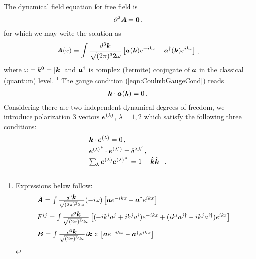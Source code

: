 The dynamical field equation for free field is
\begin{eqnarray}
\partial^2 \mbox{\boldmath $A$} = \mbox{\boldmath $0$}\,,
\end{eqnarray}
for which we may write the solution as
\begin{eqnarray}
\mbox{\boldmath $A$}(x) = \int \frac{d^3 \mbox{\boldmath $k$}}{\sqrt{(2\pi)^3}2\omega} 
\left[
\mbox{\boldmath $a$}^{}(\mbox{\boldmath $k$}) e^{-i k x} + \mbox{\boldmath $a$}^{\dagger}(\mbox{\boldmath $k$}) e^{i k x} 
\right] \,,
\label{eqn:CoulPhoAA}
\end{eqnarray}
where $\omega = k^0 = |\mbox{\boldmath $k$}|$ and $\mbox{\boldmath $a$}^{\dagger}$ is
complex (hermite) conjugate of $\mbox{\boldmath $a$}$ in the classical (quantum) level.
\footnote{%
Expressions below follow:
\begin{eqnarray}
\begin{array}{l}
\dot{\bld{A}} =
\int
\frac{d^3 \bld{k}}{\sqrt{(2\pi)^3} 2\omega}
(-i\omega)
\left[
\bld{a} e^{-ikx} - \bld{a}^\dagger e^{ikx}
\right]
\vspace{2mm}
\\
F^{ij} = 
\int
\frac{d^3 \bld{k}}{\sqrt{(2\pi)^3} 2\omega}
\left[
(-ik^i a^j + ik^j a^i )  e^{-ikx}
+
(ik^i a^{j \dagger} - ik^j a^{i \dagger} )  e^{ikx}
\right]
\vspace{2mm}
\\
\bld{B} = 
\int
\frac{d^3 \bld{k}}{\sqrt{(2\pi)^3} 2\omega}
i \bld{k} \times
\left[
\bld{a} e^{-ikx} - \bld{a}^\dagger e^{ikx}
\right]
\end{array}
\end{eqnarray}
}%
The gauge condition (\ref{eqn:CoulmbGaugeCond}) reads
\begin{eqnarray}
\mbox{\boldmath $k$} \cdot \mbox{\boldmath $a$}^{} (\mbox{\boldmath $k$}) = 0 \,.
\label{eqn:CoulmbGCondMom}
\end{eqnarray}
Considering there are two independent dynamical degrees of freedom, we introduce
polarization 3 vectors $\mbox{\boldmath $e$}^{(\lambda)}$, $\lambda = 1, 2$ which satisfy
the following three conditions:
\begin{eqnarray}
\begin{array}{l}
\bld{k} \cdot \bld{e}^{(\lambda)} = 0\,,
\vspace{1mm}
\\
{\bld{e}^{(\lambda)}}^* \cdot \bld{e}^{(\lambda')} = \delta^{\lambda \lambda'} \,,
\vspace{1mm}
\\
\sum_\lambda \bld{e}^{(\lambda)} {\bld{e}^{(\lambda)}}^* \cdot = 1 - \hat{\bld{k}} \hat{\bld{k}} \cdot \,.
\end{array}
\end{eqnarray}
